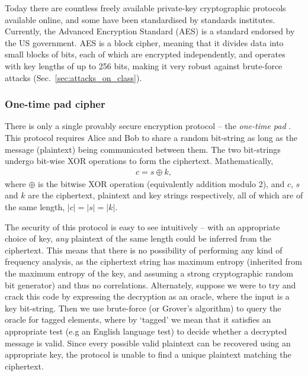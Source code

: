 Today there are countless freely available private-key cryptographic protocols available online, and some have been standardised by standards institutes. Currently, the Advanced Encryption Standard (AES) is a standard endorsed by the US government. AES is a block cipher, meaning that it divides data into small blocks of bits, each of which are encrypted independently, and operates with key lengths of up to 256 bits, making it very robust against brute-force attacks (Sec.~\ref{sec:attacks_on_class}).

%
%

\subsubsection{One-time pad cipher}

There is only a single provably secure encryption protocol -- the \textit{one-time pad} \cite{bib:Schneier96}. This protocol requires Alice and Bob to share a random bit-string as long as the message (plaintext) being communicated between them. The two bit-strings undergo bit-wise XOR operations to form the ciphertext. Mathematically,
\begin{align}
c = s \oplus k,
\end{align}
where $\oplus$ is the bitwise XOR operation (equivalently addition modulo 2), and $c$, $s$ and $k$ are the ciphertext, plaintext and key strings respectively, all of which are of the same length, \mbox{$|c|=|s|=|k|$}.

The security of this protocol is easy to see intuitively -- with an appropriate choice of key, \textit{any} plaintext of the same length could be inferred from the ciphertext. This means that there is no possibility of performing any kind of frequency analysis, as the ciphertext string has maximum entropy (inherited from the maximum entropy of the key, and assuming a strong cryptographic random bit generator) and thus no correlations. Alternately, suppose we were to try and crack this code by expressing the decryption as an oracle, where the input is a key bit-string. Then we use brute-force (or Grover's algorithm) to query the oracle for tagged elements, where by `tagged' we mean that it satisfies an appropriate test (e.g an English language test) to decide whether a decrypted message is valid. Since every possible valid plaintext can be recovered using an appropriate key, the protocol is unable to find a unique plaintext matching the ciphertext.


